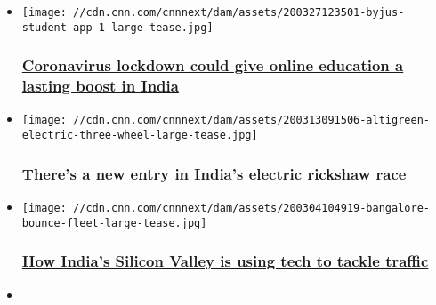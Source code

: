 \begin{itemize}
\item
  \href{/2020/04/08/tech/online-education-india-coronavirus-spc/index.html}{}

  \texttt{[image: //cdn.cnn.com/cnnnext/dam/assets/200327123501-byjus-student-app-1-large-tease.jpg]}

  \hypertarget{coronavirus-lockdown-could-give-online-education-a-lasting-boost-in-india-}{%
  \subsubsection{\texorpdfstring{\href{/2020/04/08/tech/online-education-india-coronavirus-spc/index.html}{Coronavirus
  lockdown could give online education a lasting boost in India
  }}{Coronavirus lockdown could give online education a lasting boost in India }}\label{coronavirus-lockdown-could-give-online-education-a-lasting-boost-in-india-}}
\item
  \href{/2020/03/25/energy/altigreen-india-electric-rickshaw-spc-intl/index.html}{}

  \texttt{[image: //cdn.cnn.com/cnnnext/dam/assets/200313091506-altigreen-electric-three-wheel-large-tease.jpg]}

  \hypertarget{theres-a-new-entry-in-indias-electric-rickshaw-race-}{%
  \subsubsection{\texorpdfstring{\href{/2020/03/25/energy/altigreen-india-electric-rickshaw-spc-intl/index.html}{There's
  a new entry in India's electric rickshaw race
  }}{There's a new entry in India's electric rickshaw race }}\label{theres-a-new-entry-in-indias-electric-rickshaw-race-}}
\item
  \href{/2020/03/10/business/bangalore-traffic-tech-biz-intl/index.html}{}

  \texttt{[image: //cdn.cnn.com/cnnnext/dam/assets/200304104919-bangalore-bounce-fleet-large-tease.jpg]}

  \hypertarget{how-indias-silicon-valley-is-using-tech-to-tackle-traffic}{%
  \subsubsection{\texorpdfstring{\href{/2020/03/10/business/bangalore-traffic-tech-biz-intl/index.html}{How
  India's Silicon Valley is using tech to tackle
  traffic}}{How India's Silicon Valley is using tech to tackle traffic}}\label{how-indias-silicon-valley-is-using-tech-to-tackle-traffic}}
\item
\end{itemize}

